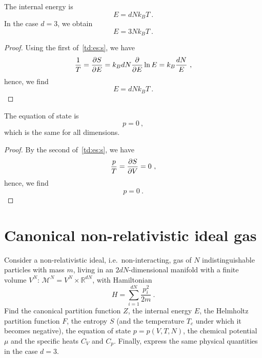     The internal energy is 
    \begin{equation*}
        E = d N k_B T ~.
    \end{equation*}
    In the case $d = 3$, we obtain 
    \begin{equation*}
        E = 3 N k_B T ~.
    \end{equation*}
    \begin{proof}
        Using the first of~\eqref{td:es:s}, we have
        \begin{equation*}
            \frac{1}{T} = \frac{\partial S}{\partial E} = k_B dN \frac{\partial}{\partial E} \ln E = k_B \frac{dN}{E} ~,
        \end{equation*}
        hence, we find
        \begin{equation*}
            E = d N k_B T ~.
        \end{equation*}
    \end{proof}
    The equation of state is  
    \begin{equation*}
        p = 0 ~,
    \end{equation*}
    which is the same for all dimensions.
    \begin{proof}
        By the second of~\eqref{td:es:s}, we have
        \begin{equation*}
            \frac{p}{T} = \frac{\partial S}{\partial V} = 0 ~,
        \end{equation*}
        hence, we find
        \begin{equation*}
            p = 0 ~.
        \end{equation*}
    \end{proof}

\section{Canonical non-relativistic ideal gas}

    \begin{exercise}
        Consider a non-relativistic ideal, i.e.~non-interacting, gas of $N$ indistinguishable particles with mass $m$, living in an $2dN$-dimensional manifold with a finite volume $V^N$: $\mathcal M^N = V^N \times \mathbb R^{dN}$, with Hamiltonian 
        \begin{equation*}
            H = \sum_{i=1}^{dN} \frac{p^2_i}{2m} ~.
        \end{equation*}
        Find the canonical partition function $Z$, the internal energy $E$, the Helmholtz partition function $F$, the entropy $S$ (and the temperature $T_c$ under which it becomes negative), the equation of state $p = p(V, T, N)$, the chemical potential $\mu$ and the specific heats $C_V$ and $C_p$. Finally, express the same physical quantities in the case $d = 3$.
    \end{exercise}

